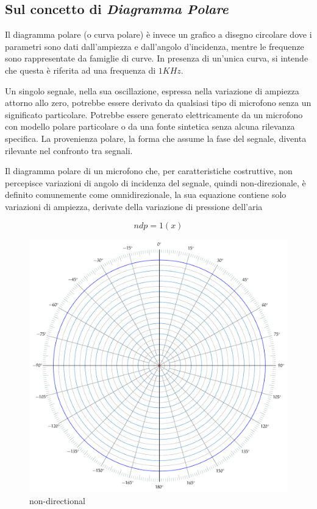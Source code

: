 \subsection{Sul concetto di \emph{Diagramma Polare}}
\label{sec:polarplot}

Il diagramma polare (o curva polare) è invece un grafico a disegno circolare
dove i parametri sono dati dall’ampiezza e dall’angolo d’incidenza, mentre le
frequenze sono rappresentate da famiglie di curve. In presenza di un’unica curva,
si intende che questa è riferita ad una frequenza di $1KHz$. %

Un singolo segnale, nella sua oscillazione, espressa nella variazione di ampiezza
attorno allo zero, potrebbe essere derivato da qualsiasi tipo di microfono senza
un significato particolare. Potrebbe essere generato elettricamente da un
microfono con modello polare particolare o da una fonte sintetica senza
alcuna rilevanza specifica. La provenienza polare, la forma che assume la fase
del segnale, diventa rilevante nel confronto tra segnali.

Il diagramma polare di un microfono che, per caratteristiche costruttive, non
percepisce variazioni di angolo di incidenza del segnale, quindi non-direzionale,
è definito comunemente come omnidirezionale, la sua equazione contiene solo
variazioni di ampiezza, derivate della variazione di pressione dell'aria

\begin{equation}
ndp = 1(x)
\label{eq:omni}
\end{equation}

\begin{figure}[h]
\centering
\includegraphics[width=1\columnwidth]{CAPITOLI/_TIKZ/POLAR/omni}
\caption{non-directional}
\label{polar:omni}
\end{figure}

